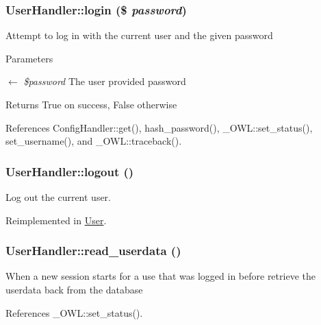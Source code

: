 \subsubsection[{login}]{\setlength{\rightskip}{0pt plus 5cm}UserHandler::login (\$ {\em password})}\label{classUserHandler_a7a0b269a54d9430f48d6490c1fe14ecd}
Attempt to log in with the current user and the given password


\begin{DoxyParams}{Parameters}
\item[\mbox{$\leftarrow$} {\em \$password}]The user provided password \end{DoxyParams}
\begin{DoxyReturn}{Returns}
True on success, False otherwise 
\end{DoxyReturn}


References ConfigHandler::get(), hash\_\-password(), \_\-OWL::set\_\-status(), set\_\-username(), and \_\-OWL::traceback().

\subsubsection[{logout}]{\setlength{\rightskip}{0pt plus 5cm}UserHandler::logout ()}\label{classUserHandler_a8000feaceda9d3c37fc56b6d1969b8f7}
Log out the current user. 

Reimplemented in \hyperlink{classUser_a06ed977c877b02b420233d4f18a6a668}{User}.

\subsubsection[{read\_\-userdata}]{\setlength{\rightskip}{0pt plus 5cm}UserHandler::read\_\-userdata ()}\label{classUserHandler_a4e9fb2f7763124ea84ebaf3b744d2d88}
When a new session starts for a use that was logged in before retrieve the userdata back from the database 

References \_\-OWL::set\_\-status().



